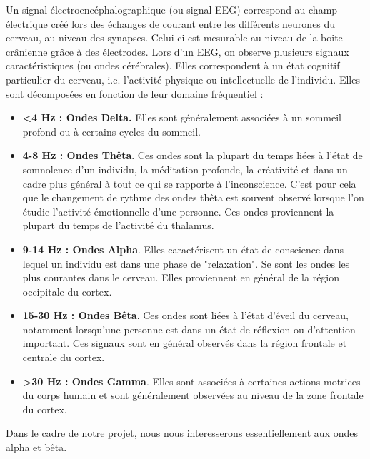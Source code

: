 Un signal électroencéphalographique (ou signal EEG) correspond au champ électrique créé lors des échanges de courant entre les différents neurones du cerveau, au niveau des synapses. Celui-ci est mesurable au niveau de la boite crânienne grâce à des électrodes. Lors d'un EEG, on observe plusieurs signaux caractéristiques (ou ondes cérébrales). Elles correspondent à un état cognitif particulier du cerveau, i.e. l'activité physique ou intellectuelle de l'individu. Elles sont décomposées en fonction de leur domaine fréquentiel \cite{Saeid} :

\begin{itemize}
	\item \textbf{<4 Hz : Ondes Delta.}
	Elles sont généralement associées à un sommeil profond ou à certains cycles du sommeil. 
	\smallbreak
	\item \textbf{4-8 Hz : Ondes Thêta}.
	Ces ondes sont la plupart du temps liées à l'état de somnolence d'un individu, la méditation profonde, la créativité et dans un cadre plus général à tout ce qui se rapporte à l'inconscience. C'est pour cela que le changement de rythme des ondes thêta est souvent observé lorsque l'on étudie l'activité émotionnelle d'une personne.
	Ces ondes proviennent la plupart du temps de l'activité du thalamus. 
	\smallbreak
	\item \textbf{9-14 Hz : Ondes Alpha}.
	Elles caractérisent un état de conscience dans lequel un individu est dans une phase de "relaxation". Se sont les ondes les plus courantes dans le cerveau. Elles proviennent en général de la région occipitale du cortex.
	\smallbreak
	\item \textbf{15-30 Hz : Ondes Bêta}.
	Ces ondes sont liées à l'état d'éveil du cerveau, notamment lorsqu'une personne est dans un état de réflexion ou d'attention important. Ces signaux sont en général observés dans la région frontale et centrale du cortex. 
	\smallbreak
	\item \textbf{>30 Hz : Ondes Gamma}.
	Elles sont associées à certaines actions motrices du corps humain et sont généralement observées au niveau de la zone frontale du cortex. 
\end{itemize}

\smallbreak

Dans le cadre de notre projet, nous nous interesserons essentiellement aux ondes alpha et bêta.
